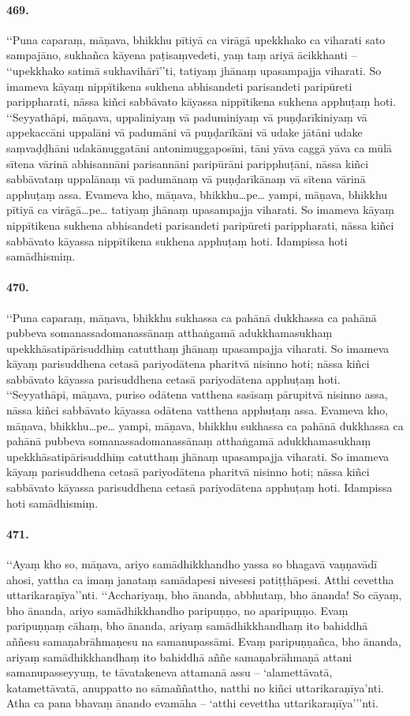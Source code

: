 \paragraph{469.} ‘‘Puna caparaṃ, māṇava, bhikkhu pītiyā ca virāgā upekkhako ca viharati sato sampajāno, sukhañca kāyena paṭisaṃvedeti, yaṃ taṃ ariyā ācikkhanti – ‘‘upekkhako satimā sukhavihārī’’ti, tatiyaṃ jhānaṃ upasampajja viharati. So imameva kāyaṃ nippītikena sukhena abhisandeti parisandeti paripūreti parippharati, nāssa kiñci sabbāvato kāyassa nippītikena sukhena apphuṭaṃ hoti. ‘‘Seyyathāpi, māṇava, uppaliniyaṃ vā paduminiyaṃ vā puṇḍarīkiniyaṃ vā appekaccāni uppalāni vā padumāni vā puṇḍarīkāni vā udake jātāni udake saṃvaḍḍhāni udakānuggatāni antonimuggaposīni, tāni yāva caggā yāva ca mūlā sītena vārinā abhisannāni parisannāni paripūrāni paripphuṭāni, nāssa kiñci sabbāvataṃ uppalānaṃ vā padumānaṃ vā puṇḍarīkānaṃ vā sītena vārinā apphuṭaṃ assa. Evameva kho, māṇava, bhikkhu…pe… yampi, māṇava, bhikkhu pītiyā ca virāgā…pe… tatiyaṃ jhānaṃ upasampajja viharati. So imameva kāyaṃ nippītikena sukhena abhisandeti parisandeti paripūreti parippharati, nāssa kiñci sabbāvato kāyassa nippītikena sukhena apphuṭaṃ hoti. Idampissa hoti samādhismiṃ.

\paragraph{470.} ‘‘Puna caparaṃ, māṇava, bhikkhu sukhassa ca pahānā dukkhassa ca pahānā pubbeva somanassadomanassānaṃ atthaṅgamā adukkhamasukhaṃ upekkhāsatipārisuddhiṃ catutthaṃ jhānaṃ upasampajja viharati. So imameva kāyaṃ parisuddhena cetasā pariyodātena pharitvā nisinno hoti; nāssa kiñci sabbāvato kāyassa parisuddhena cetasā pariyodātena apphuṭaṃ hoti. ‘‘Seyyathāpi, māṇava, puriso odātena vatthena sasīsaṃ pārupitvā nisinno assa, nāssa kiñci sabbāvato kāyassa odātena vatthena apphuṭaṃ assa. Evameva kho, māṇava, bhikkhu…pe… yampi, māṇava, bhikkhu sukhassa ca pahānā dukkhassa ca pahānā pubbeva somanassadomanassānaṃ atthaṅgamā adukkhamasukhaṃ upekkhāsatipārisuddhiṃ catutthaṃ jhānaṃ upasampajja viharati. So imameva kāyaṃ parisuddhena cetasā pariyodātena pharitvā nisinno hoti; nāssa kiñci sabbāvato kāyassa parisuddhena cetasā pariyodātena apphuṭaṃ hoti. Idampissa hoti samādhismiṃ.

\paragraph{471.} ‘‘Ayaṃ kho so, māṇava, ariyo samādhikkhandho yassa so bhagavā vaṇṇavādī ahosi, yattha ca imaṃ janataṃ samādapesi nivesesi patiṭṭhāpesi. Atthi cevettha uttarikaraṇīya’’nti. ‘‘Acchariyaṃ, bho ānanda, abbhutaṃ, bho ānanda! So cāyaṃ, bho ānanda, ariyo samādhikkhandho paripuṇṇo, no aparipuṇṇo. Evaṃ paripuṇṇaṃ cāhaṃ, bho ānanda, ariyaṃ samādhikkhandhaṃ ito bahiddhā aññesu samaṇabrāhmaṇesu na samanupassāmi. Evaṃ paripuṇṇañca, bho ānanda, ariyaṃ samādhikkhandhaṃ ito bahiddhā aññe samaṇabrāhmaṇā attani samanupasseyyuṃ, te tāvatakeneva attamanā assu – ‘alamettāvatā, katamettāvatā, anuppatto no sāmaññattho, natthi no kiñci uttarikaraṇīya’nti. Atha ca pana bhavaṃ ānando evamāha – ‘atthi cevettha uttarikaraṇīya’’’nti.

